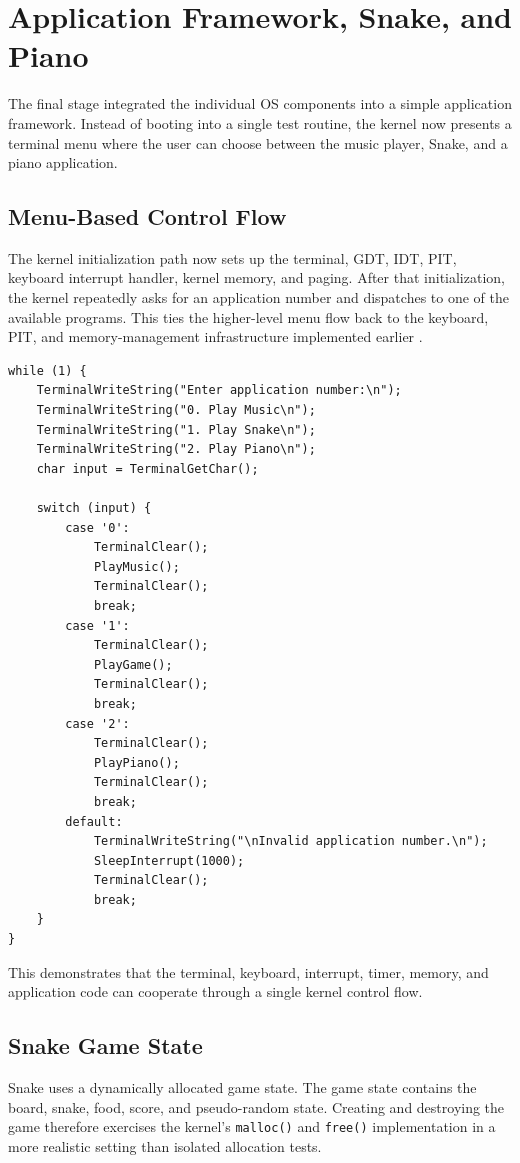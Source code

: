 \section{Application Framework, Snake, and Piano}

The final stage integrated the individual OS components into a simple application framework. Instead of booting into a single test routine, the kernel now presents a terminal menu where the user can choose between the music player, Snake, and a piano application.

\subsection{Menu-Based Control Flow}
The kernel initialization path now sets up the terminal, GDT, IDT, PIT, keyboard interrupt handler, kernel memory, and paging. After that initialization, the kernel repeatedly asks for an application number and dispatches to one of the available programs. This ties the higher-level menu flow back to the keyboard, PIT, and memory-management infrastructure implemented earlier \cite{osdevPs2Controller,osdevPit,osdevMemoryAllocation}.

\begin{listing}[H]
\begin{verbatim}
while (1) {
    TerminalWriteString("Enter application number:\n");
    TerminalWriteString("0. Play Music\n");
    TerminalWriteString("1. Play Snake\n");
    TerminalWriteString("2. Play Piano\n");
    char input = TerminalGetChar();

    switch (input) {
        case '0':
            TerminalClear();
            PlayMusic();
            TerminalClear();
            break;
        case '1':
            TerminalClear();
            PlayGame();
            TerminalClear();
            break;
        case '2':
            TerminalClear();
            PlayPiano();
            TerminalClear();
            break;
        default:
            TerminalWriteString("\nInvalid application number.\n");
            SleepInterrupt(1000);
            TerminalClear();
            break;
    }
}
\end{verbatim}
\caption{Application menu dispatch in the kernel main loop.}
\end{listing}

This demonstrates that the terminal, keyboard, interrupt, timer, memory, and application code can cooperate through a single kernel control flow.
\clearpage

\subsection{Snake Game State}
Snake uses a dynamically allocated game state. The game state contains the board, snake, food, score, and pseudo-random state. Creating and destroying the game therefore exercises the kernel's \texttt{malloc()} and \texttt{free()} implementation in a more realistic setting than isolated allocation tests.

